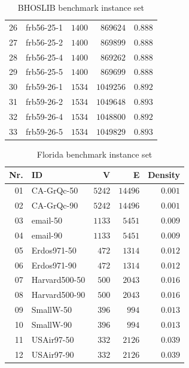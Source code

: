 \documentclass[draft,final]{vutinfth} %
\begin{document}
\begin{table}
\begin{tabular}{|r|l|r|r|r|}
        26 &frb56-25-1 & $1400$ & $869624$ & $0.888$\\
        27 &frb56-25-2 & $1400$ & $869899$ & $0.888$\\
        28 &frb56-25-4 & $1400$ & $869262$ & $0.888$\\
        29 &frb56-25-5 & $1400$ & $869699$ & $0.888$\\
        30 &frb59-26-1 & $1534$ & $1049256$ & $0.892$\\
        31 &frb59-26-2 & $1534$ & $1049648$ & $0.893$\\
        32 &frb59-26-4 & $1534$ & $1048800$ & $0.892$\\
        33 &frb59-26-5 & $1534$ & $1049829$ & $0.893$\\ \hline
    \end{tabular}
    \caption{BHOSLIB benchmark instance set}
    \label{tab:BHOSLIB}    
\end{table}

\begin{table}
    \centering
    \begin{tabular}{|r|l|r|r|r|}
        \hline
        \textbf{Nr.} & \textbf{ID} & \textbf{V} & \textbf{E} & \textbf{Density} \\ \hline
        01 & CA-GrQc-50 & $5242$ & $14496$ & $0.001$\\
        02 & CA-GrQc-90 & $5242$ & $14496$ & $0.001$\\
        03 & email-50 & $1133$ & $5451$ & $0.009$\\
        04 & email-90 & $1133$ & $5451$ & $0.009$\\
        05 & Erdos971-50 & $472$ & $1314$ & $0.012$\\
        06 & Erdos971-90 & $472$ & $1314$ & $0.012$\\
        07 & Harvard500-50 & $500$ & $2043$ & $0.016$\\
        08 & Harvard500-90 & $500$ & $2043$ & $0.016$\\
        09 & SmallW-50 & $396$ & $994$ & $0.013$\\
        10 & SmallW-90 & $396$ & $994$ & $0.013$\\
        11 & USAir97-50 & $332$ & $2126$ & $0.039$\\
        12 & USAir97-90 & $332$ & $2126$ & $0.039$\\ \hline
    \end{tabular}
    \caption{Florida benchmark instance set}
    \label{tab:Florida}
\end{table}
\end{document}
